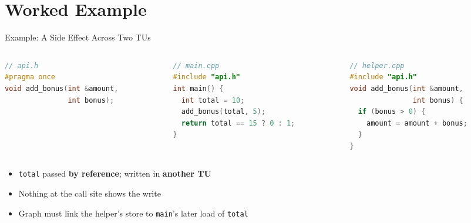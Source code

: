 \documentclass[aspectratio=169,10pt]{beamer}
\newcommand{\code}[1]{\texttt{#1}}
\begin{document}
\section{Worked Example}

\begin{frame}[fragile]{Example: A Side Effect Across Two TUs}
  \begin{columns}[T]
    \begin{column}{0.28\textwidth}
\begin{lstlisting}[language=C++, basicstyle=\ttfamily\footnotesize]
// api.h
#pragma once
void add_bonus(int &amount,
               int bonus);
\end{lstlisting}
    \end{column}
    \begin{column}{0.36\textwidth}
\begin{lstlisting}[language=C++, basicstyle=\ttfamily\footnotesize]
// main.cpp
#include "api.h"
int main() {
  int total = 10;
  add_bonus(total, 5);
  return total == 15 ? 0 : 1;
}
\end{lstlisting}
    \end{column}
    \begin{column}{0.33\textwidth}
\begin{lstlisting}[language=C++, basicstyle=\ttfamily\footnotesize]
// helper.cpp
#include "api.h"
void add_bonus(int &amount,
               int bonus) {
  if (bonus > 0) {
    amount = amount + bonus;
  }
}
\end{lstlisting}
    \end{column}
  \end{columns}

  \vspace{1.2em}
  \begin{itemize}
    \item \code{total} passed \textbf{by reference}; written in \textbf{another TU}
    \item Nothing at the call site shows the write
    \item Graph must link the helper's store to \code{main}'s later load of \code{total}
  \end{itemize}
\end{frame}
\end{document}
